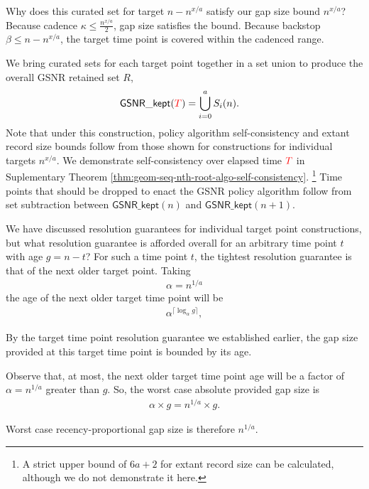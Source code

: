 Why does this curated set for target $n - n^{x/a}$ satisfy our gap size bound $n^{x/a}$?
Because cadence $\kappa \leq \frac{n^{x/a}}{2}$, gap size satisfies the bound.
Because backstop $\beta \leq n - n ^{x/a}$, the target time point is covered within the cadenced range.

We bring curated sets for each target point together in a set union to produce the overall GSNR retained set $R$,
\begin{align}
  \mathsf{GSNR\_kept}(\colorT)
  &=
  \bigcup_{i=0}^{a} S_i(n).
\label{eqn:gsrn_kept}
\end{align}
Note that under this construction, policy algorithm self-consistency and extant record size bounds follow from those shown for constructions for individual targets $n^{x/a}$.
We demonstrate self-consistency over elapsed time $\colorT$ in Suplementary Theorem \ref{thm:geom-seq-nth-root-algo-self-consistency}.
\footnote{
A strict upper bound of $6a + 2$ for extant record size can be calculated, although we do not demonstrate it here.
}
Time points that should be dropped to enact the GSNR policy algorithm follow from set subtraction between $\mathsf{GSNR\_kept}(n)$ and $\mathsf{GSNR\_kept}(n+1)$.

We have discussed resolution guarantees for individual target point constructions, but what resolution guarantee is afforded overall for an arbitrary time point $t$ with age $g = n - t$?
For such a time point $t$, the tightest resolution guarantee is that of the next older target point.
Taking
\begin{align*}
\alpha = n^{1/a}
\end{align*}
the age of the next older target time point will be
\begin{align*}
\alpha^{ \lceil \log_{\alpha} g \rceil },
\end{align*}

By the target time point resolution guarantee we established earlier, the gap size provided at this target time point is bounded by its age.

Observe that, at most, the next older target time point age will be a factor of $\alpha = n^{1/a}$ greater than $g$.
So, the worst case absolute provided gap size is
\begin{align*}
\alpha \times g = n^{1/a} \times g.
\end{align*}

Worst case recency-proportional gap size is therefore $n^{1/a}$.

